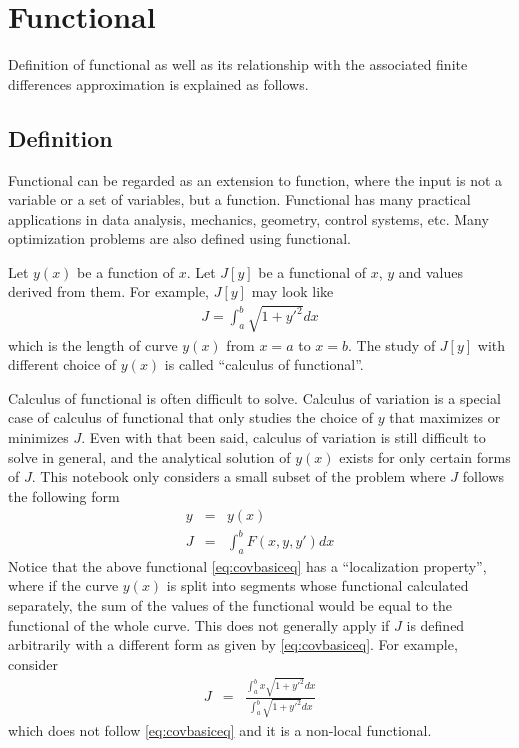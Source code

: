 \section{Functional}

Definition of functional as well as its relationship with the associated finite differences approximation is explained as follows.

\subsection{Definition}

Functional can be regarded as an extension to function, where the input is not a variable or a set of variables, but a function. Functional has many practical applications in data analysis, mechanics, geometry, control systems, etc. Many optimization problems are also defined using functional.

Let $y(x)$ be a function of $x$. Let $J[y]$ be a functional of $x$, $y$ and values derived from them. For example, $J[y]$ may look like
\begin{eqnarray}
	J = \int_{a}^{b} \sqrt{1+y\prime^2} dx \nonumber
\end{eqnarray}
which is the length of curve $y(x)$ from $x=a$ to $x=b$. The study of $J[y]$ with different choice of $y(x)$ is called ``calculus of functional''. 

Calculus of functional is often difficult to solve. Calculus of variation is a special case of calculus of functional that only studies the choice of $y$ that maximizes or minimizes $J$. Even with that been said, calculus of variation is still difficult to solve in general, and the analytical solution of $y(x)$ exists for only certain forms of $J$. This notebook only considers a small subset of the problem where $J$ follows the following form
\begin{eqnarray}
	y &=& y(x) \nonumber \\
	J &=& \int_{a}^{b}F\left(x, y, y\prime \right)dx \label{eq:covbasiceq}
\end{eqnarray}
Notice that the above functional \eqref{eq:covbasiceq} has a ``localization property'', where if the curve $y(x)$ is split into segments whose functional calculated separately, the sum of the values of the functional would be equal to the functional of the whole curve. This does not generally apply if $J$ is defined arbitrarily with a different form as given by \eqref{eq:covbasiceq}. For example, consider
\begin{eqnarray}
	J &=& \frac{\int_{a}^{b}x\sqrt{1+y\prime^2}dx}{\int_{a}^{b}\sqrt{1+y\prime^2}dx} \nonumber
\end{eqnarray}
which does not follow \eqref{eq:covbasiceq} and it is a non-local functional.

